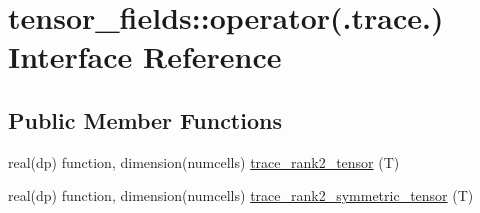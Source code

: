 \hypertarget{interfacetensor__fields_1_1operator_07_8trace_8_08}{\section{tensor\-\_\-fields\-:\-:operator(.trace.) Interface Reference}
\label{interfacetensor__fields_1_1operator_07_8trace_8_08}
}
\subsection*{Public Member Functions}
\begin{DoxyCompactItemize}
\item 
real(dp) function, dimension(numcells) \hyperlink{interfacetensor__fields_1_1operator_07_8trace_8_08_a5c68b49859b03ed959c17a5eb7c8b168}{trace\-\_\-rank2\-\_\-tensor} (T)
\item 
real(dp) function, dimension(numcells) \hyperlink{interfacetensor__fields_1_1operator_07_8trace_8_08_af62393f3656a54c908352e444e77c7c2}{trace\-\_\-rank2\-\_\-symmetric\-\_\-tensor} (T)
\end{DoxyCompactItemize}


